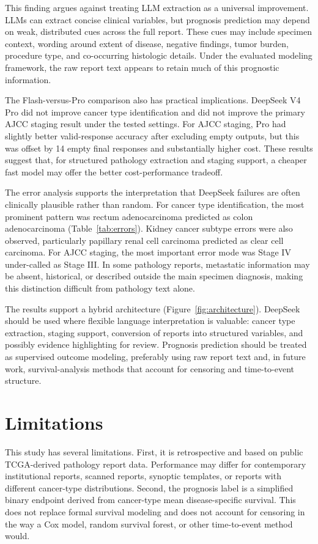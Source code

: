 \documentclass[pdflatex,sn-vancouver-num]{sn-jnl}
\begin{document}
This finding argues against treating LLM extraction as a universal improvement. LLMs can extract concise clinical variables, but prognosis prediction may depend on weak, distributed cues across the full report. These cues may include specimen context, wording around extent of disease, negative findings, tumor burden, procedure type, and co-occurring histologic details. Under the evaluated modeling framework, the raw report text appears to retain much of this prognostic information.

The Flash-versus-Pro comparison also has practical implications. DeepSeek V4 Pro did not improve cancer type identification and did not improve the primary AJCC staging result under the tested settings. For AJCC staging, Pro had slightly better valid-response accuracy after excluding empty outputs, but this was offset by 14 empty final responses and substantially higher cost. These results suggest that, for structured pathology extraction and staging support, a cheaper fast model may offer the better cost-performance tradeoff.

The error analysis supports the interpretation that DeepSeek failures are often clinically plausible rather than random. For cancer type identification, the most prominent pattern was rectum adenocarcinoma predicted as colon adenocarcinoma (Table~\ref{tab:errors}). Kidney cancer subtype errors were also observed, particularly papillary renal cell carcinoma predicted as clear cell carcinoma. For AJCC staging, the most important error mode was Stage IV under-called as Stage III. In some pathology reports, metastatic information may be absent, historical, or described outside the main specimen diagnosis, making this distinction difficult from pathology text alone.

The results support a hybrid architecture (Figure~\ref{fig:architecture}). DeepSeek should be used where flexible language interpretation is valuable: cancer type extraction, staging support, conversion of reports into structured variables, and possibly evidence highlighting for review. Prognosis prediction should be treated as supervised outcome modeling, preferably using raw report text and, in future work, survival-analysis methods that account for censoring and time-to-event structure.

\section{Limitations}\label{sec:limitations}

This study has several limitations. First, it is retrospective and based on public TCGA-derived pathology report data. Performance may differ for contemporary institutional reports, scanned reports, synoptic templates, or reports with different cancer-type distributions. Second, the prognosis label is a simplified binary endpoint derived from cancer-type mean disease-specific survival. This does not replace formal survival modeling and does not account for censoring in the way a Cox model, random survival forest, or other time-to-event method would.
\end{document}

